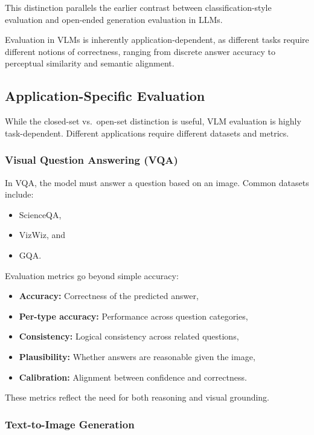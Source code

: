 \documentclass{article}
\begin{document}
This distinction parallels the earlier contrast between classification-style evaluation and open-ended generation evaluation in LLMs.

Evaluation in VLMs is inherently application-dependent, as different tasks require different notions of correctness, ranging from discrete answer accuracy to perceptual similarity and semantic alignment.

\subsection{Application-Specific Evaluation}

While the closed-set vs.\ open-set distinction is useful, VLM evaluation is highly task-dependent. Different applications require different datasets and metrics.

\subsubsection{Visual Question Answering (VQA)}

In VQA, the model must answer a question based on an image. Common datasets include:
\begin{itemize}
    \item ScienceQA,
    \item VizWiz, and
    \item GQA.
\end{itemize}

Evaluation metrics go beyond simple accuracy:
\begin{itemize}
    \item \textbf{Accuracy:} Correctness of the predicted answer,
    \item \textbf{Per-type accuracy:} Performance across question categories,
    \item \textbf{Consistency:} Logical consistency across related questions,
    \item \textbf{Plausibility:} Whether answers are reasonable given the image,
    \item \textbf{Calibration:} Alignment between confidence and correctness.
\end{itemize}

These metrics reflect the need for both reasoning and visual grounding.

\subsubsection{Text-to-Image Generation}
\end{document}
